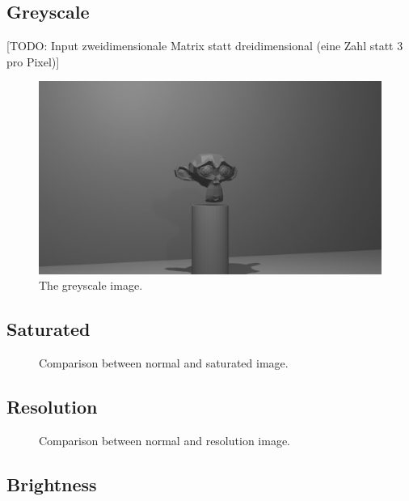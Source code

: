 \subsection{Greyscale}
[TODO: Input zweidimensionale Matrix statt dreidimensional (eine Zahl statt 3 pro Pixel)]

\begin{figure}[h!]
	\centering
	\includegraphics[width=5in]{img/implementation_opencv_greyscale.png}
	\caption{The greyscale image.}
	\label{pic:implementation_opencv_greyscale}
\end{figure}

\subsection{Saturated}

\begin{figure}[h!]
	\centering
	\caption{Comparison between normal and saturated image.}
	\label{pic:implementation_opencv_saturated}
\end{figure}

\subsection{Resolution}

\begin{figure}[h!]
	\centering
	\caption{Comparison between normal and resolution image.}
	\label{pic:implementation_opencv_resolution}
\end{figure}

\subsection{Brightness}

